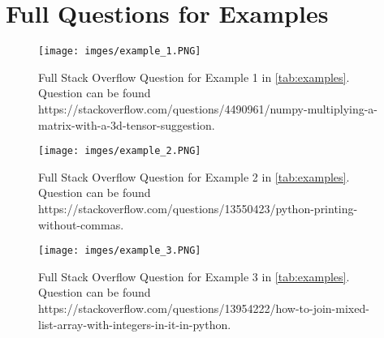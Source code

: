 \documentclass[11pt]{article}
\begin{document}
\section{Full Questions for Examples}\label{subsec:exampleimage}
\begin{figure*}[hb!]
    
    \centering
     \begin{subfigure}[h]{.6\linewidth}
     
        \texttt{[image: imges/example\_1.PNG]}
        \caption{Full Stack Overflow Question for Example 1 in \autoref{tab:examples}. Question can be found https://stackoverflow.com/questions/4490961/numpy-multiplying-a-matrix-with-a-3d-tensor-suggestion.}
        \label{fig:example1}
     \end{subfigure}
    \vfill
    \vfill
    \begin{subfigure}[h]{.6\linewidth}
         \centering
         \texttt{[image: imges/example\_2.PNG]}
         \caption{Full Stack Overflow Question for Example 2 in \autoref{tab:examples}. Question can be found https://stackoverflow.com/questions/13550423/python-printing-without-commas.}
         \label{fig:example2}
     \end{subfigure}
     \vfill
     
    \begin{subfigure}[h]{.6\linewidth}
         \centering
         \texttt{[image: imges/example\_3.PNG]}
         \caption{Full Stack Overflow Question for Example 3 in \autoref{tab:examples}. Question can be found https://stackoverflow.com/questions/13954222/how-to-join-mixed-list-array-with-integers-in-it-in-python.}
         \label{fig:example3}
     \end{subfigure}
\end{figure*}
\end{document}
